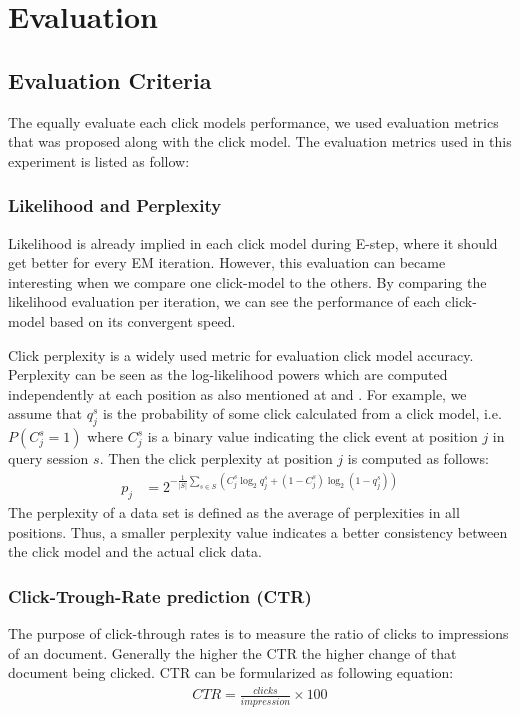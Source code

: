 \section{Evaluation}
\label{sec:evaluation}

\subsection{Evaluation Criteria}
The equally evaluate each click models performance, we used evaluation metrics that was proposed along with the click model. The evaluation metrics used in this experiment is listed as follow:

\subsubsection{Likelihood and Perplexity}
Likelihood is already implied in each click model during E-step, where it should get better for every EM iteration. 
However, this evaluation can became interesting when we compare one click-model to the others. 
By comparing the likelihood evaluation per iteration, we can see the performance of each click-model based on its convergent speed. 

Click perplexity is a widely used metric for evaluation click model accuracy. 
Perplexity can be seen as the log-likelihood powers which are computed independently at each position as also mentioned at \cite{Zhang2011} and \cite{Dupret2008}. 
For example, we assume that $q_j^s$ is the probability of some click calculated from a click model, i.e. $P(C_j^s=1)$ where $C_j^s$ is a binary value indicating the click event at position $j$ in query session $s$. Then the click perplexity at position $j$ is computed as follows:
\begin{align*}
	p_j 
	&= 2^{-\frac{1}{|S|} \sum_{s \in S}(C_j^s \log_2 q_j^s + (1-C_j^s) \log_2 (1-q_j^s))}
\end{align*}
The perplexity of a data set is defined as the average of perplexities in all positions.
Thus, a smaller perplexity value indicates a better consistency between the click model and the actual click data.

\subsubsection{Click-Trough-Rate prediction (CTR)}
The purpose of click-through rates is to measure the ratio of clicks to impressions of an document.
Generally the higher the CTR the higher change of that document being clicked.
CTR can be formularized as following equation:
\begin{align*}
	CTR = \frac{clicks}{impression} \times 100
\end{align*}

